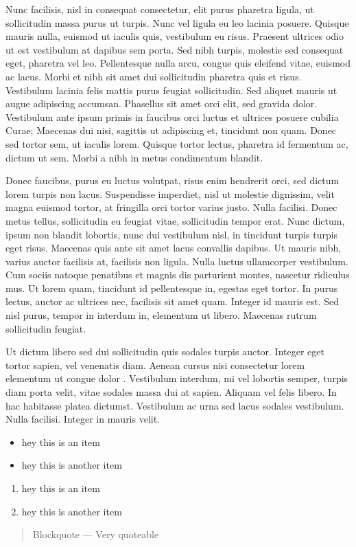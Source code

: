 Nunc facilisis, nisl in consequat consectetur, elit purus pharetra
ligula, ut sollicitudin massa purus ut turpis. Nunc vel ligula eu leo
lacinia posuere. Quisque mauris nulla, euismod ut iaculis quis,
vestibulum eu risus. Praesent ultrices odio ut est vestibulum at dapibus
sem porta. Sed nibh turpis, molestie sed consequat eget, pharetra vel
leo. Pellentesque nulla arcu, congue quis eleifend vitae, euismod ac
lacus. Morbi et nibh sit amet dui sollicitudin pharetra quis et risus.
Vestibulum lacinia felis mattis purus feugiat sollicitudin. Sed aliquet
mauris ut augue adipiscing accumsan. Phasellus sit amet orci elit, sed
gravida dolor. Vestibulum ante ipsum primis in faucibus orci luctus et
ultrices posuere cubilia Curae; Maecenas dui nisi, sagittis ut
adipiscing et, tincidunt non quam. Donec sed tortor sem, ut iaculis
lorem. Quisque tortor lectus, pharetra id fermentum ac, dictum ut sem.
Morbi a nibh in metus condimentum blandit.

Donec faucibus, purus eu luctus volutpat, risus enim hendrerit orci, sed
dictum lorem turpis non lacus. Suspendisse imperdiet, nisl ut molestie
dignissim, velit magna euismod tortor, at fringilla orci tortor varius
justo. Nulla facilisi. Donec metus tellus, sollicitudin eu feugiat
vitae, sollicitudin tempor erat. Nunc dictum, ipsum non blandit
lobortis, nunc dui vestibulum nisl, in tincidunt turpis turpis eget
risus. Maecenas quis ante sit amet lacus convallis dapibus. Ut mauris
nibh, varius auctor facilisis at, facilisis non ligula. Nulla luctus
ullamcorper vestibulum. Cum sociis natoque penatibus et magnis dis
parturient montes, nascetur ridiculus mus. Ut lorem quam, tincidunt id
pellentesque in, egestas eget tortor. In purus lectus, auctor ac
ultrices nec, facilisis sit amet quam. Integer id mauris est. Sed nisl
purus, tempor in interdum in, elementum ut libero. Maecenas rutrum
sollicitudin feugiat.

Ut dictum libero sed dui sollicitudin quis sodales turpis auctor.
Integer eget tortor sapien, vel venenatis diam. Aenean cursus nisi
consectetur lorem elementum ut congue dolor . Vestibulum interdum, mi
vel lobortis semper, turpis diam porta velit, vitae sodales massa dui at
sapien. Aliquam vel felis libero. In hac habitasse platea dictumst.
Vestibulum ac urna sed lacus sodales vestibulum. Nulla facilisi. Integer
in mauris velit.

\begin{itemize}
\item
  hey this is an item
\item
  hey this is another item
\end{itemize}
\begin{enumerate}
\item
  hey this is an item
\item
  hey this is another item
\end{enumerate}
\begin{quote}
Blockquote --- Very quoteable

\end{quote}
